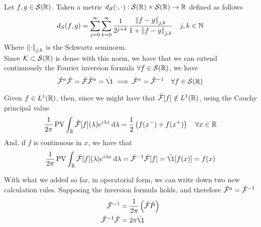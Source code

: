 \documentclass[../complete.tex]{subfiles}
\begin{document}
\begin{thm}
	Let $f,g\in\mathcal{S}(\mathbb{R})$. Taken a metric $d_{\mathcal{S}}(\cdot,\cdot):\mathcal{S}(\mathbb{R})\times\mathcal{S}(\mathbb{R})\to\mathbb{R}$ defined as follows
	\begin{equation*}
		d_{\mathcal{S}}(f,g)=\sum_{j=0}^{\infty}\sum_{k=0}^{\infty}\frac{1}{2^{j+k}}\frac{\norm{f-g}_{j,k}}{1+\norm{f-g}_{j,k}}\quad j,k\in\mathbb{N}
	\end{equation*}
	Where $\norm{\cdot}_{j,k}$ is the Schwartz seminorm.\\
	Since $\mathcal{K}\subset\mathcal{S}(\mathbb{R})$ is dense with this norm, we have that we can extend continuously the Fourier inversion formula $\forall f\in\mathcal{S}(\mathbb{R})$, we have
	\begin{equation*}
		\fou^a\fou=\fou\fou^a=\hat{\1}\implies\fou^a=\fou^{-1}\quad\forall f\in\Sp(\R)
	\end{equation*}
\end{thm}
\begin{thm}
	Given $f\in L^1(\mathbb{R})$, then, since we might have that $\hat{\mathcal{F}}[f]\notin L^1(\mathbb{R})$, using the Cauchy principal value
	\begin{equation}
		\frac{1}{2\pi}\operatorname{\mathrm{PV}}\int_{\mathbb{R}}^{}\hat{\mathcal{F}}[f](\lambda)e^{i\lambda x}\operatorname{d\!}\lambda=\frac{1}{2}\left( f(x^-)+f(x^+) \right)\quad\forall x\in\mathbb{R}
		\label{eq:antitrasf}
	\end{equation}
	And, if $f$ is continuous in $x$, we have that
	\begin{equation*}
		\frac{1}{2\pi}\cpv\int_{\R}^{}\fou[f](\lambda)e^{i\lambda x}\diff\lambda=\fou^{-1}\fou[f]=\hat{\1}[f(x)]=f(x)
	\end{equation*}
\end{thm}
\begin{thm}
	With what we added so far, in operatorial form, we can write down two new calculation rules. Supposing the inversion formula holds, and therefore $\hat{\mathcal{F}}^a=\hat{\mathcal{F}}^{-1}$
	\begin{equation}
		\begin{aligned}
			\fou^{-1}&=\frac{1}{2\pi}\left( \fou\opr{P} \right)\\
			\fou^{-1}\fou&=2\pi\opr{\1}
		\end{aligned}
		\label{eq:invtransrules}
	\end{equation}
\end{thm}
\end{document}
